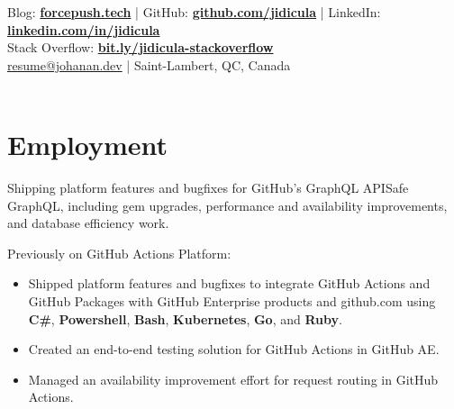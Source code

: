 \documentclass[]{jidicula-resume}
\begin{document}
\livelocation\hfill\lastupdated{}

{ Blog: \href{http://bit.ly/jidicula-site}{\bf forcepush.tech}
  | GitHub: \href{http://bit.ly/jidicula_github}{\bf github.com/jidicula} | LinkedIn: \href{https://bit.ly/jidicula-linkedin}{\bf linkedin.com/in/jidicula} \\
  Stack Overflow: \href{https://bit.ly/jidicula-stackoverflow}{\bf bit.ly/jidicula-stackoverflow} \\ \href{mailto:resume@johanan.dev}{resume@johanan.dev}
  | Saint-Lambert, QC, Canada \\~\\
}

\section{Employment}

\vspace{\topsep} %
\begin{tightemize}
\item Shipping platform features and bugfixes for GitHub's GraphQL APISafe GraphQL, including gem upgrades, performance and availability improvements, and database efficiency work.
\item Previously on GitHub Actions Platform:
  \begin{itemize}
  \item Shipped platform features and bugfixes to integrate GitHub Actions and GitHub Packages with GitHub Enterprise products and github.com using \textbf{C\#}, \textbf{Powershell}, \textbf{Bash}, \textbf{Kubernetes}, \textbf{Go}, and \textbf{Ruby}.
  \item Created an end-to-end testing solution for GitHub Actions in GitHub AE.
  \item Managed an availability improvement effort for request routing in GitHub Actions.
  \end{itemize}
\end{tightemize}
\sectionsep{}
\end{document}
